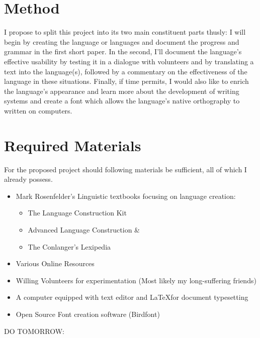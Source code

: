 \documentclass[a4paper,10pt]{article}
\begin{document}
\section{Method}
I propose to split this project into its two main constituent parts thusly:
I will begin by creating the language or languages and document the progress and grammar in
the first short paper. In the second, I'll document the language's effective usability by
testing it in a dialogue with volunteers and by translating a text into the language(s),
followed by a commentary on the effectiveness of the language in these situations.
Finally, if time permits, I would also like to enrich the language's appearance and learn
more about the development of writing systems and create a font which allows the language's
native orthography to written on computers.

\section{Required Materials}
For the proposed project should following materials be sufficient, all of which I already possess.
\begin{itemize}
    \item Mark Rosenfelder's Linguistic textbooks focusing on language creation:
    \begin{itemize}
        \item The Language Construction Kit
        \item Advanced Language Construction \&
        \item The Conlanger's Lexipedia
    \end{itemize}
    \item Various Online Resources
    \item Willing Volunteers for experimentation (Most likely my long-suffering friends)
    \item A computer equipped with text editor and \LaTeX for document typesetting
    \item Open Source Font creation software (Birdfont)
\end{itemize}

\Huge{DO TOMORROW:}\small
\end{document}
